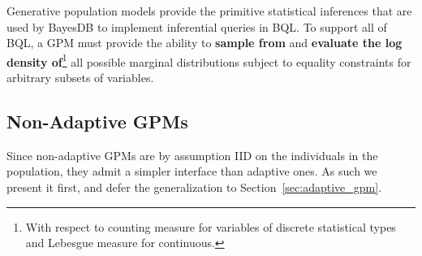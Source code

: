 \documentclass[10pt,letterpaper]{article}
\begin{document}
Generative population models provide the primitive statistical inferences that
are used by BayesDB to implement inferential queries in BQL. To support all of
BQL, a GPM must provide the ability to \textbf{sample from} and \textbf{evaluate
the log density of}\footnote{With respect to counting measure for variables of
discrete statistical types and Lebesgue measure for continuous.}
all possible marginal distributions subject to equality
constraints for arbitrary subsets of variables.

\subsection{Non-Adaptive GPMs}
\label{sec:non-adaptive_gpm}

Since non-adaptive GPMs are by assumption IID on the individuals in
the population, they admit a simpler interface than adaptive ones.  As
such we present it first, and defer the generalization to
Section~\ref{sec:adaptive_gpm}.
\end{document}
